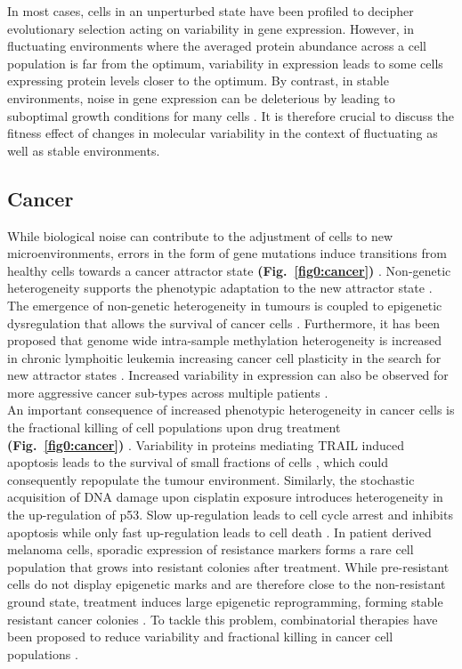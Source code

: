 In most cases, cells in an unperturbed state have been profiled to decipher evolutionary selection acting on variability in gene expression.
However, in fluctuating environments where the averaged protein abundance across a cell population is far from the optimum, variability in expression leads to some cells expressing protein levels closer to the optimum. 
By contrast, in stable environments, noise in gene expression can be deleterious by leading to suboptimal growth conditions for many cells \cite{Schmiedel2018,Duveau2018}.
It is therefore crucial to discuss the fitness effect of changes in molecular variability in the context of fluctuating as well as stable environments.

\subsection{Cancer}

While biological noise can contribute to the adjustment of cells to new microenvironments, errors in the form of gene mutations induce transitions from healthy cells towards a cancer attractor state \textbf{(Fig.~\ref{fig0:cancer})} \citep{Marusyk2012}. 
Non-genetic heterogeneity supports the phenotypic adaptation to the new attractor state \citep{Jia2017}. 
The emergence of non-genetic heterogeneity in tumours is coupled to epigenetic dysregulation that allows the survival of cancer cells \citep{Timp2013}. 
Furthermore, it has been proposed that genome wide intra-sample methylation heterogeneity is increased in chronic lymphoitic leukemia increasing cancer cell plasticity in the search for new attractor states \citep{Landau2014}. 
Increased variability in expression can also be observed for more aggressive cancer sub-types across multiple patients \citep{Ecker2015}. \\

An important consequence of increased phenotypic heterogeneity in cancer cells is the fractional killing of cell populations upon drug treatment \textbf{(Fig.~\ref{fig0:cancer})} \citep{Flusberg2015}. 
Variability in proteins mediating \Gls{TRAIL} induced apoptosis leads to the survival of small fractions of cells \citep{Spencer2009}, which could consequently repopulate the tumour environment. 
Similarly, the stochastic acquisition of DNA damage upon cisplatin exposure introduces heterogeneity in the up-regulation of p53. 
Slow up-regulation leads to cell cycle arrest and inhibits apoptosis while only fast up-regulation leads to cell death \citep{Paek2016}. 
In patient derived melanoma cells, sporadic expression of resistance markers forms a rare cell population that grows into resistant colonies after treatment. 
While pre-resistant cells do not display epigenetic marks and are therefore close to the non-resistant ground state, treatment induces large epigenetic reprogramming, forming stable resistant cancer colonies \citep{Shaffer2017}. 
To tackle this problem, combinatorial therapies have been proposed to reduce variability and fractional killing in cancer cell populations \cite{Paek2016, Roux2015}.

